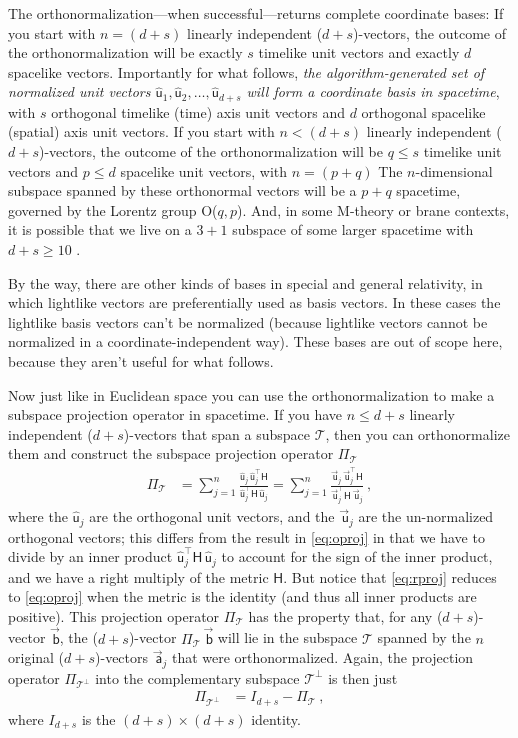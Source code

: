 \documentclass{article}
\newcommand{\metric}{\mathsf{H}}
\newcommand{\proj}{\mathsf{\Pi}}
\newcommand\upvec[1]{\!\vec{\,\mathrm{#1}}}
\newcommand{\Lvec}[1]{\upvec{\mathsf{#1}}} %
\newcommand{\Lhat}[1]{\hat{\mathsf{#1}}} %
\newcommand{\plus}{\!+\!} %
\begin{document}
The orthonormalization---when successful---returns complete coordinate bases:
If you start with $n=(d+s)$ linearly independent ($d\plus s$)-vectors, the outcome of the orthonormalization will be exactly $s$ timelike unit vectors and exactly $d$ spacelike vectors.
Importantly for what follows, \emph{the algorithm-generated set of normalized unit vectors $\Lhat{u}_1,\Lhat{u}_2,\ldots,\Lhat{u}_{d+s}$ will form a coordinate basis in spacetime}, with $s$ orthogonal timelike (time) axis unit vectors and $d$ orthogonal spacelike (spatial) axis unit vectors.
If you start with $n<(d+s)$ linearly independent ($d\plus s$)-vectors, the outcome of the orthonormalization will be $q\leq s$ timelike unit vectors and $p\leq d$ spacelike unit vectors, with $n=(p+q)$
The $n$-dimensional subspace spanned by these orthonormal vectors will be a $p\plus q$ spacetime, governed by the Lorentz group O($q,p$).
And, in some M-theory or brane contexts, it is possible that we live on a $3\plus 1$ subspace of some larger spacetime with $d+s\geq 10$ \cite{branes, strings}.

By the way, there are other kinds of bases in special and general relativity, in which lightlike vectors are preferentially used as basis vectors.
In these cases the lightlike basis vectors can't be normalized (because lightlike vectors cannot be normalized in a coordinate-independent way).
These bases are out of scope here, because they aren't useful for what follows.

Now just like in Euclidean space you can use the orthonormalization to make a subspace projection operator in spacetime.
If you have $n\leq d+s$ linearly independent ($d\plus s$)-vectors that span a subspace $\mathscr{T}$, then you can orthonormalize them and construct the subspace projection operator $\proj_\mathscr{T}$
\begin{align}\label{eq:rproj}
    \proj_\mathscr{T} &= \sum_{j=1}^n \frac{\Lhat{u}_j\,\Lhat{u}_j^\top\metric}{\Lhat{u}_j^\top\metric\,\Lhat{u}_j} = \sum_{j=1}^n \frac{\Lvec{u}_j\,\Lvec{u}_j^\top\metric}{\Lvec{u}_j^\top\metric\,\Lvec{u}_j} ~,
\end{align}
where the $\Lhat{u}_j$ are the orthogonal unit vectors, and the $\Lvec{u}_j$ are the un-normalized orthogonal vectors; this differs from the result in \eqref{eq:oproj} in that we have to divide by an inner product $\Lhat{u}_j^\top\metric\,\Lhat{u}_j$ to account for the sign of the inner product, and we have a right multiply of the metric $\metric$.
But notice that \eqref{eq:rproj} reduces to \eqref{eq:oproj} when the metric is the identity (and thus all inner products are positive).
This projection operator $\proj_\mathscr{T}$ has the property that, for any ($d\plus s$)-vector $\Lvec{b}$, the ($d\plus s$)-vector $\proj_\mathscr{T}\,\Lvec{b}$ will lie in the subspace $\mathscr{T}$ spanned by the $n$ original ($d\plus s$)-vectors $\Lvec{a}_j$ that were orthonormalized.
Again, the projection operator $\proj_{\mathscr{T}^\perp}$ into the complementary subspace $\mathscr{T}^\perp$ is then just
\begin{align}\label{eq:lprojcomp}
    \proj_{\mathscr{T}^\perp} &= I_{d+s} - \proj_\mathscr{T} ~,
\end{align}
where $I_{d+s}$ is the $(d+s)\times(d+s)$ identity.
\end{document}
